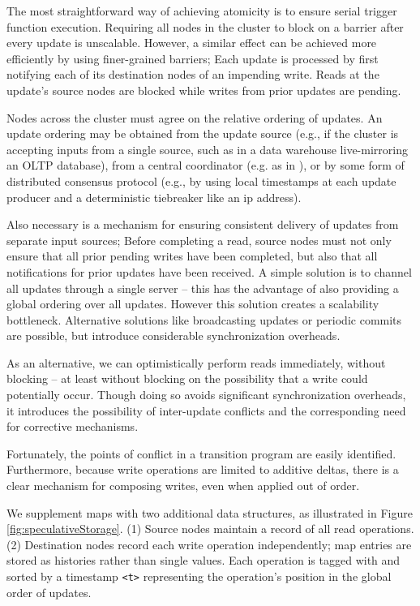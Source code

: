 The most straightforward way of achieving atomicity is to ensure serial trigger function execution.  Requiring all nodes in the cluster to block on a barrier after every update is unscalable.  However, a similar effect can be achieved more efficiently by using finer-grained barriers; Each update is processed by first notifying each of its destination nodes of an impending write.  Reads at the update's source nodes are blocked while writes from prior updates are pending.

Nodes across the cluster must agree on the relative ordering of updates.  An update ordering may be obtained from the update source (e.g., if the cluster is accepting inputs from a single source, such as in a data warehouse live-mirroring an OLTP database), from a central coordinator (e.g. as in \cite{peng-incremental:10}), or by some form of distributed consensus protocol (e.g., by using local timestamps at each update producer and a deterministic tiebreaker like an ip address).

Also necessary is a mechanism for ensuring consistent delivery of updates from separate input sources; Before completing a read, source nodes must not only ensure that all prior pending writes have been completed, but also that all notifications for prior updates have been received.  A simple solution is to channel all updates through a single server -- this has the advantage of also providing a global ordering over all updates.  However this solution creates a scalability bottleneck.  Alternative solutions like broadcasting updates or periodic commits are possible, but introduce considerable synchronization overheads.

As an alternative, we can optimistically perform reads immediately, without blocking -- at least without blocking on the possibility that a write could potentially occur.  Though doing so avoids significant synchronization overheads, it introduces the possibility of inter-update conflicts and the corresponding need for corrective mechanisms.  

Fortunately, the points of conflict in a transition program are easily identified.  Furthermore, because write operations are limited to additive deltas, there is a clear mechanism for composing writes, even when applied out of order.

We supplement maps with two additional data structures, as illustrated in Figure \ref{fig:speculativeStorage}.  (1) Source nodes maintain a record of all read operations.  (2) Destination nodes record each write operation independently; map entries are stored as histories rather than single values.  Each operation is tagged with and sorted by a timestamp \texttt{<t>} representing the operation's position in the global order of updates.

